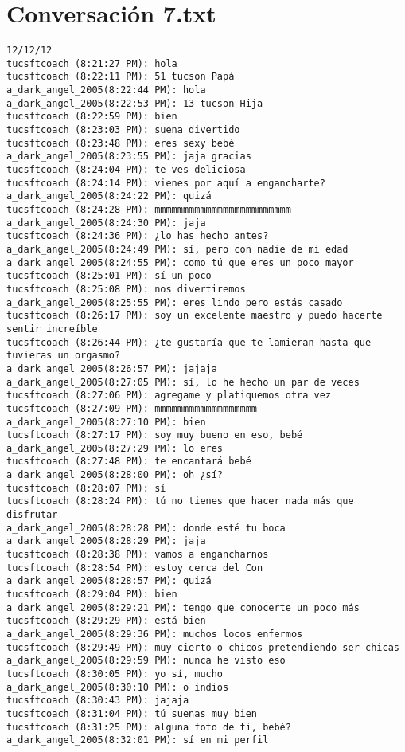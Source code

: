 \section{Conversaci\'on 7.txt}

\begin{verbatim}
12/12/12
tucsftcoach (8:21:27 PM): hola
tucsftcoach (8:22:11 PM): 51 tucson Papá
a_dark_angel_2005(8:22:44 PM): hola
a_dark_angel_2005(8:22:53 PM): 13 tucson Hija
tucsftcoach (8:22:59 PM): bien
tucsftcoach (8:23:03 PM): suena divertido
tucsftcoach (8:23:48 PM): eres sexy bebé
a_dark_angel_2005(8:23:55 PM): jaja gracias
tucsftcoach (8:24:04 PM): te ves deliciosa
tucsftcoach (8:24:14 PM): vienes por aquí a engancharte?
a_dark_angel_2005(8:24:22 PM): quizá
tucsftcoach (8:24:28 PM): mmmmmmmmmmmmmmmmmmmmmmmm
a_dark_angel_2005(8:24:30 PM): jaja
tucsftcoach (8:24:36 PM): ¿lo has hecho antes?
a_dark_angel_2005(8:24:49 PM): sí, pero con nadie de mi edad
a_dark_angel_2005(8:24:55 PM): como tú que eres un poco mayor
tucsftcoach (8:25:01 PM): sí un poco
tucsftcoach (8:25:08 PM): nos divertiremos
a_dark_angel_2005(8:25:55 PM): eres lindo pero estás casado
tucsftcoach (8:26:17 PM): soy un excelente maestro y puedo hacerte sentir increíble
tucsftcoach (8:26:44 PM): ¿te gustaría que te lamieran hasta que tuvieras un orgasmo?
a_dark_angel_2005(8:26:57 PM): jajaja
a_dark_angel_2005(8:27:05 PM): sí, lo he hecho un par de veces
tucsftcoach (8:27:06 PM): agregame y platiquemos otra vez
tucsftcoach (8:27:09 PM): mmmmmmmmmmmmmmmmmm
a_dark_angel_2005(8:27:10 PM): bien
tucsftcoach (8:27:17 PM): soy muy bueno en eso, bebé
a_dark_angel_2005(8:27:29 PM): lo eres
tucsftcoach (8:27:48 PM): te encantará bebé
a_dark_angel_2005(8:28:00 PM): oh ¿sí?
tucsftcoach (8:28:07 PM): sí
tucsftcoach (8:28:24 PM): tú no tienes que hacer nada más que disfrutar
a_dark_angel_2005(8:28:28 PM): donde esté tu boca
a_dark_angel_2005(8:28:29 PM): jaja
tucsftcoach (8:28:38 PM): vamos a engancharnos
tucsftcoach (8:28:54 PM): estoy cerca del Con
a_dark_angel_2005(8:28:57 PM): quizá
tucsftcoach (8:29:04 PM): bien
a_dark_angel_2005(8:29:21 PM): tengo que conocerte un poco más
tucsftcoach (8:29:29 PM): está bien
a_dark_angel_2005(8:29:36 PM): muchos locos enfermos
tucsftcoach (8:29:49 PM): muy cierto o chicos pretendiendo ser chicas
a_dark_angel_2005(8:29:59 PM): nunca he visto eso
tucsftcoach (8:30:05 PM): yo sí, mucho
a_dark_angel_2005(8:30:10 PM): o indios 
tucsftcoach (8:30:43 PM): jajaja
tucsftcoach (8:31:04 PM): tú suenas muy bien
tucsftcoach (8:31:25 PM): alguna foto de ti, bebé?
a_dark_angel_2005(8:32:01 PM): sí en mi perfil

\end{verbatim}
